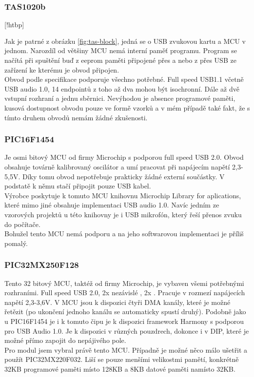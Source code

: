 \subsubsection{TAS1020b}	
[!htbp]

Jak je patrné z obrázku \ref{fig:tas-block}, jedná se o USB \iis zvukovou kartu a MCU v jednom. Narozdíl od většiny MCU nemá interní paměť programu. Program se načítá při spuštění buď z eeprom paměti připojené přes \iic a nebo z přes USB ze zařízení ke kterému je obvod připojen.\\
Obvod podle specifikace \cite{tas} podporuje všechno potřebné. Full speed USB1.1 včetně USB audio 1.0, 14 endpointů z toho až dva mohou být isochronní. Dále až dvě vstupní \iis rozhraní a jednu \iic sběrnici. Nevýhodou je absence programové paměti, kusová dostupnost obvodu pouze ve formě vzorků a v mém případě také fakt, že s tímto druhem obvodů nemám žádné zkušenosti.

\subsubsection{PIC16F1454}
Je osmi bitový MCU od firmy Microchip s podporou full speed USB 2.0. Obvod obsahuje továrně kalibrovaný oscilátor a umí pracovat při napájecím napětí 2,3-5,5V. Díky tomu obvod nepotřebuje prakticky žádné externí součástky. V podstatě k němu stačí připojit pouze USB kabel.\\
Výrobce poskytuje k tomuto MCU knihovnu Microchip Library for aplications, které mimo jiné obsahuje implementaci USB audio 1.0. Navíc jedním ze vzorových projektů u této knihovny je i USB mikrofón, který řeší přenos zvuku do počítače.\\
Bohužel tento MCU nemá podporu \iis a na jeho softwarovou implementaci je příliš pomalý. 

\subsubsection{PIC32MX250F128}
Tento 32 bitový MCU, taktéž od firmy Microchip, je vybaven všemi potřebnými rozhraními. Full speed USB 2.0, 2x nezávislé \iis, 2x \iic. Pracuje v rozmezí napájecích napětí 2,3-3,6V. V MCU jsou k dispozici čtyři DMA kanály, které je možné řetězit (po ukončení jednoho kanálu se automaticky spustí druhý). Podobně jako u PIC16F1454 je i k tomuto čipu je k dispozici framework Harmony \cite{harmony} s podporou pro USB Audio 1.0. Je k dispozici v různých pouzdrech, dokonce i v DIP, které je možné přímo zapojit do nepájivého pole.\\
Pro modul jsem vybral právě tento MCU. Případně je možné něco málo ušetřit a použít PIC32MX220F032. Liší se pouze menšími velikostmi pamětí, konkrétně 32KB programové paměti místo 128KB a 8KB datové paměti namísto 32KB.

